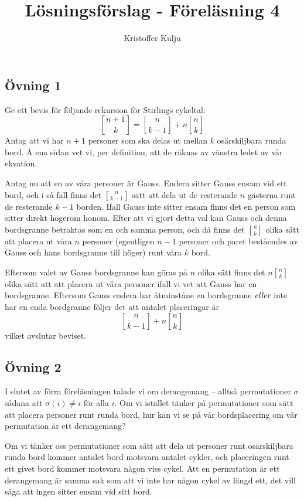 \documentclass{article}
\title{Lösningsförslag - Föreläsning 4}
\author{Kristoffer Kulju}
\begin{document}
\maketitle

\subsection*{Övning 1}
Ge ett bevis för följande rekursion för Stirlings cykeltal:
$$
{n + 1 \brack k} = {n \brack k - 1} + n{n \brack k}
$$
Antag att vi har $n+1$ personer som ska delas ut mellan $k$ osärskiljbara runda bord. Å ena sidan vet vi, per definition, att de räknas av vänstra ledet av vår ekvation. 

Antag nu att en av våra personer är Gauss. Endera sitter Gauss ensam vid ett bord, och i så fall finns det ${n \brack k - 1}$ sätt att dela ut de resterande $n$ gästerna runt de resterande $k-1$ borden. Ifall Gauss inte sitter ensam finns det en person som sitter direkt högerom honom. Efter att vi gjort detta val kan Gauss och denna bordsgranne betraktas som en och samma person, och då finns det ${n \brack k}$ olika sätt att placera ut våra $n$ personer (egentligen $n - 1$ personer och paret beståendes av Gauss och hans bordsgranne till höger) runt våra $k$ bord. 

Eftersom valet av Gauss bordsgranne kan göras på $n$ olika sätt finns det $n{n \brack k}$ olika sätt att att placera ut våra personer ifall vi vet att Gauss har en bordsgranne. Eftersom Gauss endera har åtminståne en bordsgranne $\emph{eller}$ inte har en enda bordgranne följer det att antalet placeringar är $$
{n \brack k - 1} + n{n \brack k}
$$ vilket avslutar beviset.
 
\subsection*{Övning 2}
I slutet av förra föreläsningen talade vi om derangemang – alltså permutationer $\sigma$ sådana att $\sigma(i)\neq i$ för alla $i$. Om vi istället tänker på permutationer som sätt att placera personer runt runda bord, hur kan vi se på vår bordsplacering om vår permutation är ett derangemang?

Om vi tänker oss permutationer som sätt att dela ut personer runt osärskiljbara runda bord kommer antalet bord motsvara antalet cykler, och placeringen runt ett givet bord kommer motsvara någon viss cykel. Att en permutation är ett derangemang är samma sak som att vi inte har någon cykel av längd ett, det vill säga att ingen sitter ensam vid sitt bord.
\end{document}

